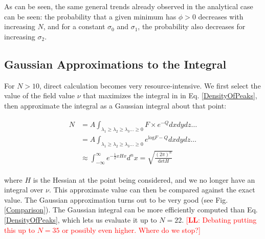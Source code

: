 \documentclass[12pt]{article}
\newcommand{\lfl}[1]{\textcolor{red}{[{\bf LL}: #1]}}
\begin{document}
As can be seen, the same general trends already observed in the analytical case can be seen: the probability that a given minimum has $\phi > 0$ decreases with increasing $N$, and for a constant $\sigma_0$ and $\sigma_1$, the probability also decreases for increasing $\sigma_2$.


\subsection{Gaussian Approximations to the Integral}
For $N>10$, direct calculation becomes very resource-intensive. We first select the value of the field value $\nu$ that maximizes the integral in in Eq. \ref{DensityOfPeaks}, then approximate the integral as a Gaussian integral about that point:

\begin{align*}
\begin{split}
N &= A \int_{\lambda_1 \geq \lambda_2 \geq \lambda_3 \ldots \geq 0} F \times e^{-Q} dx dy dz \ldots \\
&=A\int_{\lambda_1 \geq \lambda_2 \geq \lambda_3 \ldots \geq 0} e^{\mathrm{log}F-Q} dx dy dz \ldots \\
&\approx \int_{-\infty}^{\infty} e^{-\frac{1}{2}xHx} d^nx = \sqrt{\frac{(2\pi)^n}{\mathrm{det} H}}
\end{split}
\end{align*}

\noindent where $H$ is the Hessian at the point being considered, and we no longer have an integral over $\nu$. This approximate value can then be compared against the exact value. The Gaussian approximation turns out to be very good (see Fig. \ref{Comparison}). The Gaussian integral can be more efficiently computed than Eq. \ref{DensityOfPeaks}, which lets us evaluate it up to $N=22$. \lfl{Debating putting this up to $N=35$ or possibly even higher. Where do we stop?}
\end{document}

